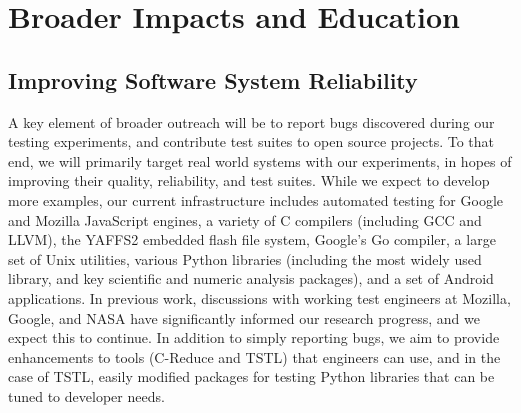 \section{Broader Impacts and Education}



\subsection{Improving Software System Reliability}

A key element of broader outreach will be to report bugs discovered
during our testing experiments, and contribute test suites to open
source projects.  To that end, we will primarily target real world
systems with our experiments, in hopes of improving their quality,
reliability, and test suites.  While we expect to develop more
examples, our current infrastructure includes automated testing for
Google and Mozilla JavaScript engines, a variety of C compilers
(including GCC and LLVM), the YAFFS2 \cite{yaffs2} embedded flash file
system, Google's Go compiler, a large set of Unix utilities, various
Python libraries (including the most widely used library, and key
scientific and numeric analysis packages), and a set of Android
applications.  In previous work, discussions with working test
engineers at Mozilla, Google, and NASA have significantly informed our
research progress, and we expect this to continue.  In addition to
simply reporting bugs, we aim to provide enhancements to tools
(C-Reduce and TSTL) that engineers can use, and in the case of TSTL,
easily modified packages for testing Python libraries that can be
tuned to developer needs.

